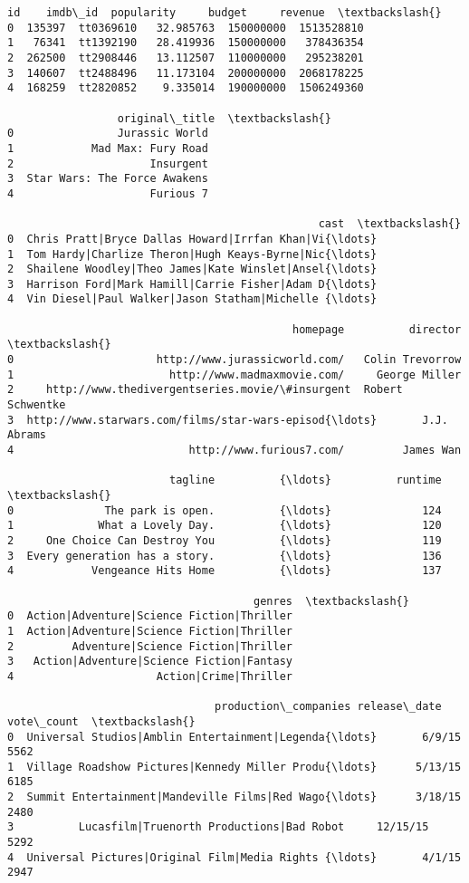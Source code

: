 \documentclass[11pt]{article}
\begin{document}
    \begin{Verbatim}[commandchars=\\\{\}]
       id    imdb\_id  popularity     budget     revenue  \textbackslash{}
0  135397  tt0369610   32.985763  150000000  1513528810   
1   76341  tt1392190   28.419936  150000000   378436354   
2  262500  tt2908446   13.112507  110000000   295238201   
3  140607  tt2488496   11.173104  200000000  2068178225   
4  168259  tt2820852    9.335014  190000000  1506249360   

                 original\_title  \textbackslash{}
0                Jurassic World   
1            Mad Max: Fury Road   
2                     Insurgent   
3  Star Wars: The Force Awakens   
4                     Furious 7   

                                                cast  \textbackslash{}
0  Chris Pratt|Bryce Dallas Howard|Irrfan Khan|Vi{\ldots}   
1  Tom Hardy|Charlize Theron|Hugh Keays-Byrne|Nic{\ldots}   
2  Shailene Woodley|Theo James|Kate Winslet|Ansel{\ldots}   
3  Harrison Ford|Mark Hamill|Carrie Fisher|Adam D{\ldots}   
4  Vin Diesel|Paul Walker|Jason Statham|Michelle {\ldots}   

                                            homepage          director  \textbackslash{}
0                      http://www.jurassicworld.com/   Colin Trevorrow   
1                        http://www.madmaxmovie.com/     George Miller   
2     http://www.thedivergentseries.movie/\#insurgent  Robert Schwentke   
3  http://www.starwars.com/films/star-wars-episod{\ldots}       J.J. Abrams   
4                           http://www.furious7.com/         James Wan   

                         tagline          {\ldots}          runtime  \textbackslash{}
0              The park is open.          {\ldots}              124   
1             What a Lovely Day.          {\ldots}              120   
2     One Choice Can Destroy You          {\ldots}              119   
3  Every generation has a story.          {\ldots}              136   
4            Vengeance Hits Home          {\ldots}              137   

                                      genres  \textbackslash{}
0  Action|Adventure|Science Fiction|Thriller   
1  Action|Adventure|Science Fiction|Thriller   
2         Adventure|Science Fiction|Thriller   
3   Action|Adventure|Science Fiction|Fantasy   
4                      Action|Crime|Thriller   

                                production\_companies release\_date vote\_count  \textbackslash{}
0  Universal Studios|Amblin Entertainment|Legenda{\ldots}       6/9/15       5562   
1  Village Roadshow Pictures|Kennedy Miller Produ{\ldots}      5/13/15       6185   
2  Summit Entertainment|Mandeville Films|Red Wago{\ldots}      3/18/15       2480   
3          Lucasfilm|Truenorth Productions|Bad Robot     12/15/15       5292   
4  Universal Pictures|Original Film|Media Rights {\ldots}       4/1/15       2947   


\end{Verbatim}
\end{document}
